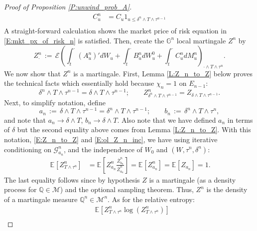 \documentclass[11pt, letterpaper]{amsart}
\theoremstyle{definition}
\theoremstyle{remark}
\numberwithin{equation}{section}
\newcommand{\qprob}{\mathbb{Q}}
\newcommand{\esp}{\mathbb{E}}
\newcommand{\espalt}[2]{\esp^{#1}\bra{#2}}
\newcommand{\G}{\mathcal{G}}
\newcommand{\M}{\mathcal{M}}
\newcommand{\filtg}{\mathbb{G}}
\newcommand{\EN}{\mathcal{E}}
\newcommand{\dfn}{\, := \,}
\newcommand{\bra}[1]{\left[#1\right]}
\newcommand{\ol}[1]{\overline{#1}}
\begin{document}
\begin{proof}[Proof of Proposition \ref{P:unwind_prob_A}]
\begin{equation*}
\begin{split}
C^n_u &= C_u1_{u\leq \delta^n \wedge T\wedge \tau^{n-1}}\\
\end{split}
\end{equation*}
A straight-forward calculation shows the market price of risk equation in \eqref{E:mkt_px_of_risk_n} is satisfied. Then, create the $\filtg^n$ local martingale $Z^n$ by
\begin{equation*}
Z^n_\cdot \dfn \EN\left(\int_t^\cdot (A^n_u)'dW_u + \int_t^\cdot B^n_u dW^0_u + \int_{t}^\cdot C^n_u dM^n_u\right)_{\cdot\wedge T\wedge \tau^n}.
\end{equation*}
We now show that $Z^n$ is a martingale.  First, Lemma \ref{L:Z_n_to_Z} below proves the technical facts which essentially hold because $\chi_n = 1$ on $E_{n-1}$:
\begin{equation}\label{E:Z_n_to_Z}
\delta^n\wedge T \wedge \tau^{n-1} = \delta\wedge T\wedge\tau^{n-1};\qquad Z^n_{\delta^n\wedge T\wedge\tau^{n-1}} = Z_{\delta\wedge T\wedge\tau^{n-1}}.
\end{equation}
Next, to simplify notation, define
\begin{equation}\label{E:a_n_b_n_def}
a_n\dfn \delta\wedge T\wedge \tau^{n-1} = \delta^n\wedge T\wedge\tau^{n-1};\qquad b_n\dfn\delta^n\wedge T\wedge \tau^n,
\end{equation}
and note that $a_n\rightarrow \delta\wedge T$, $b_n\rightarrow \delta\wedge T$. Also note that we have defined $a_n$ in terms of $\delta$ but the second equality above comes from Lemma \ref{L:Z_n_to_Z}. With this notation, \eqref{E:Z_n_to_Z} and \eqref{E:ol_Z_n_inc}, we have using iterative conditioning on $\G^n_{a_n}$, and the independence of $W_0$ and $(W,\tau^n,\delta^n)$:
\begin{equation*}\
\begin{split}
\espalt{}{Z^n_{T\wedge\tau^n}} &= \espalt{}{Z^n_{a_n}\frac{\ol{Z}^n_{b_n}}{\ol{Z}^n_{a_n}}} = \espalt{}{Z^n_{a_n}}= \espalt{}{Z_{a_n}} =1.
\end{split}
\end{equation*}
The last equality follows since by hypothesis $Z$ is a martingale (as a density process for $\qprob\in\M$) and the optional sampling theorem. Thus, $Z^n$ is the density of a martingale measure $\qprob^n\in\M^n$.   As for the relative entropy:
\begin{equation}\label{E:Z_n_rel_ent_equality}
\begin{split}
&\espalt{}{Z^n_{T\wedge\tau^n}\log\left(Z^n_{T\wedge\tau^n}\right)}\\

\end{split}
\end{equation}
\end{proof}
\end{document}

